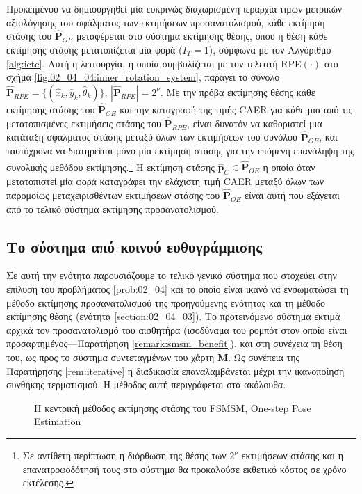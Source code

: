Προκειμένου να δημιουργηθεί μία ευκρινώς διαχωρισμένη ιεραρχία τιμών μετρικών
αξιολόγησης του σφάλματος των εκτιμήσεων προσανατολισμού, κάθε εκτίμηση στάσης
του $\hat{\bm{P}}_{OE}$ μεταφέρεται στο σύστημα εκτίμησης θέσης, όπου η θέση
κάθε εκτίμησης στάσης μετατοπίζεται μία φορά ($I_T = 1$), σύμφωνα με τον
Αλγόριθμο \ref{alg:icte}. Αυτή η λειτουργία, η οποία συμβολίζεται με τον τελεστή
RPE$(\cdot)$ στο σχήμα \ref{fig:02_04_04:inner_rotation_system}, παράγει το
σύνολο $\hat{\bm{P}}_{RPE} = \{(\hat{x}_k, \hat{y}_k, \hat{\theta}_k)\}$,
$|\hat{\bm{P}}_{RPE}| = 2^\nu$. Με την πρόβα εκτίμησης θέσης κάθε εκτίμησης
στάσης του $\hat{\bm{P}}_{OE}$ και την καταγραφή της τιμής CAER για κάθε μια
από τις μετατοπισμένες εκτιμήσεις στάσης του $\hat{\bm{P}}_{RPE}$, είναι
δυνατόν να καθοριστεί μια κατάταξη σφάλματος στάσης μεταξύ όλων των εκτιμήσεων
του συνόλου $\hat{\bm{P}}_{OE}$, και ταυτόχρονα να διατηρείται μόνο μία
εκτίμηση στάσης για την επόμενη επανάληψη της συνολικής μεθόδου
εκτίμησης.\footnote{Σε αντίθετη περίπτωση η διόρθωση της θέσης των $2^\nu$
εκτιμήσεων στάσης και η επανατροφοδότησή τους στο σύστημα θα προκαλούσε
εκθετικό κόστος σε χρόνο εκτέλεσης.} Η εκτίμηση στάσης $\hat{\bm{p}}_C \in
\hat{\bm{P}}_{OE}$ η οποία όταν μετατοπιστεί μία φορά καταγράφει την ελάχιστη
τιμή CAER μεταξύ όλων των παρομοίως μεταχειρισθέντων εκτιμήσεων στάσης του
$\hat{\bm{P}}_{OE}$ είναι αυτή που εξάγεται από το τελικό σύστημα εκτίμησης
προσανατολισμού.


\subsection{Το σύστημα από κοινού ευθυγράμμισης}
\label{subsection:02_04_04:02}

Σε αυτή την ενότητα παρουσιάζουμε το τελικό γενικό σύστημα που στοχεύει στην
επίλυση του προβλήματος \ref{prob:02_04} και το οποίο είναι ικανό να
ενσωματώσει τη μέθοδο εκτίμησης προσανατολισμού της προηγούμενης ενότητας και
τη μέθοδο εκτίμησης θέσης (ενότητα \ref{section:02_04_03}). Το προτεινόμενο
σύστημα εκτιμά αρχικά τον προσανατολισμό του αισθητήρα (ισοδύναμα του ρομπότ
στον οποίο είναι προσαρτημένος---Παρατήρηση \ref{remark:smsm_benefit}), και στη
συνέχεια τη θέση του, ως προς το σύστημα συντεταγμένων του χάρτη $\bm{M}$. Ως
συνέπεια της Παρατήρησης \ref{rem:iterative} η διαδικασία επαναλαμβάνεται
μέχρι την ικανοποίηση συνθήκης τερματισμού. Η μέθοδος αυτή περιγράφεται στα
ακόλουθα.

\begin{figure}\centering
  
  \caption{\small Η κεντρική μέθοδος εκτίμησης στάσης του FSMSM,
           One-step Pose Estimation}
  \label{fig:02_04_04:inner_system}
\end{figure}


